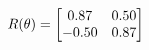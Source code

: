 \documentclass[preview]{standalone}
\begin{document}
\begin{align*}
\special{dvisvgm:raw <g id='unique000'>}R(\theta) = \begin{bmatrix}0.87 & 0.50\\-0.50 & 0.87\end{bmatrix}\special{dvisvgm:raw </g>}
\end{align*}
\end{document}

